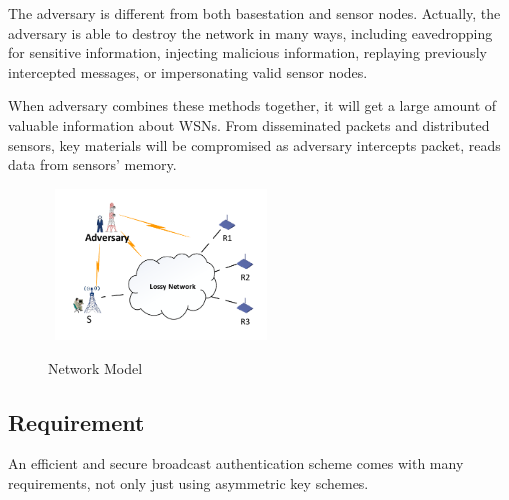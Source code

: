 \documentclass{sig-alternate-05-2015}
\begin{document}
The adversary is different from both basestation and sensor nodes. Actually, the adversary is able to destroy the network in many ways, including eavedropping for sensitive information, injecting malicious information, replaying previously intercepted messages, or impersonating valid sensor nodes.

When adversary combines these methods together, it will get a large amount of valuable information about WSNs. From disseminated packets and distributed sensors, key materials will be compromised as adversary intercepts packet, reads data from sensors' memory.
	
\begin{figure}
\centering
\includegraphics[width=6cm,height=4cm]{antenna.pdf}\\
\caption{Network Model}\label{} 
\end{figure}

\subsection{Requirement}

An efficient and secure broadcast authentication scheme comes with many requirements, not only just using asymmetric key schemes.
\end{document}
